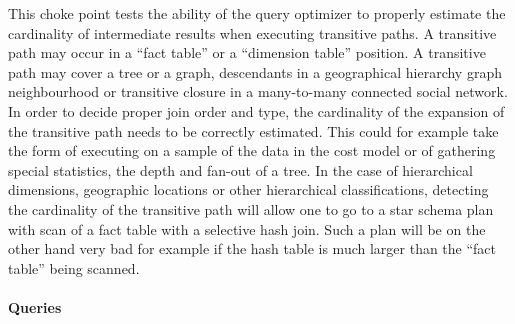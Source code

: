 
This choke point tests the ability of the query optimizer to properly estimate the cardinality of intermediate results when executing transitive paths. A transitive path may occur in a ``fact table'' or a ``dimension table'' position.
A transitive path may cover a tree or a graph, \eg descendants in a geographical hierarchy \vs graph neighbourhood or transitive closure in a many-to-many connected social network.
In order to decide proper join order and type, the cardinality of the expansion of the transitive path needs to be correctly estimated.
This could for example take the form of executing on a sample of the data in the
cost model or of gathering special statistics, \eg the depth and fan-out of a tree. In the case of hierarchical dimensions,
\eg geographic locations or other hierarchical classifications, detecting the cardinality of the transitive path will allow one to go to a star schema plan with scan of a fact table with a selective hash join.
Such a plan will be on the other hand very bad for example if the hash table is much larger than the ``fact table'' being scanned.


\paragraph{Queries}
{\raggedright

}
